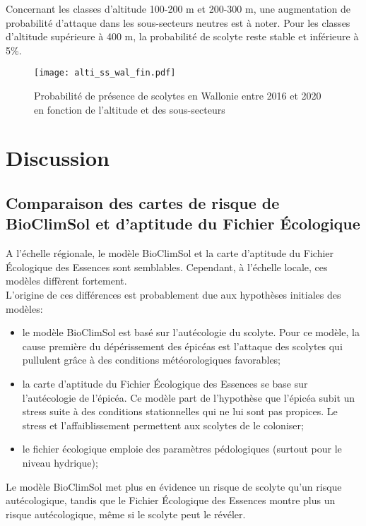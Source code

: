 Concernant les classes d'altitude 100-200 m et 200-300 m, une augmentation de probabilité d'attaque dans les sous-secteurs neutres est à noter. 
Pour les classes d'altitude supérieure à 400 m, la probabilité de scolyte reste stable et inférieure à 5\%.
\begin{figure} [htbp] 
	\centering
	\texttt{[image: alti\_ss\_wal\_fin.pdf]}
	\caption{Probabilité de présence de scolytes en Wallonie entre 2016 et 2020 en fonction de l'altitude et des sous-secteurs }
	\label{fig:wall}
\end{figure}


 \section{Discussion}
\subsection{Comparaison des cartes de risque de BioClimSol et d'aptitude du Fichier Écologique}
A l'échelle régionale, le modèle BioClimSol et la carte d'aptitude du Fichier Écologique des Essences sont semblables. Cependant, à l'échelle locale, ces modèles diffèrent fortement.\\

L'origine de ces différences est probablement due aux hypothèses initiales des modèles:

\begin{itemize}
	\item le modèle BioClimSol est basé sur l'autécologie du scolyte. Pour ce modèle, la cause première du dépérissement des épicéas est l'attaque des scolytes qui pullulent grâce à des conditions météorologiques favorables;
	\item la carte d'aptitude du Fichier Écologique des Essences se base sur l'autécologie de l'épicéa. Ce modèle part de l'hypothèse que l'épicéa subit un stress suite à des conditions stationnelles qui ne lui sont pas propices. Le stress et l'affaiblissement permettent aux scolytes de le coloniser;
	\item le fichier écologique emploie des paramètres pédologiques (surtout pour le niveau hydrique);
\end{itemize}

Le modèle BioClimSol met plus en évidence un risque de scolyte qu'un risque autécologique, tandis que le Fichier Écologique des Essences montre plus un risque autécologique, même si le scolyte peut le révéler.






